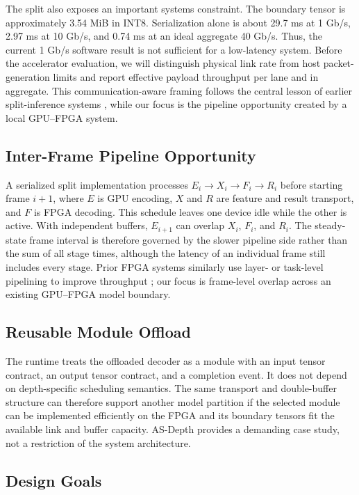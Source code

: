 \documentclass[sigconf]{support/acmart}
\begin{document}
The split also exposes an important systems constraint.  The boundary tensor is
approximately 3.54 MiB in INT8.  Serialization alone is about 29.7 ms at
1 Gb/s, 2.97 ms at 10 Gb/s, and 0.74 ms at an ideal aggregate 40 Gb/s.  Thus,
the current 1 Gb/s software result is not sufficient for a low-latency system.
Before the accelerator evaluation, we will distinguish physical link rate from
host packet-generation limits and report effective payload throughput per lane
and in aggregate.  This communication-aware framing follows the central lesson
of earlier split-inference systems \cite{matsubara2019split}, while our focus is
the pipeline opportunity created by a local GPU--FPGA system.

\subsection{Inter-Frame Pipeline Opportunity}

A serialized split implementation processes $E_i\rightarrow X_i\rightarrow
F_i\rightarrow R_i$ before starting frame $i+1$, where $E$ is GPU encoding,
$X$ and $R$ are feature and result transport, and $F$ is FPGA decoding.  This
schedule leaves one device idle while the other is active.  With independent
buffers, $E_{i+1}$ can overlap $X_i$, $F_i$, and $R_i$.  The steady-state frame
interval is therefore governed by the slower pipeline side rather than the sum
of all stage times, although the latency of an individual frame still includes
every stage.  Prior FPGA systems similarly use layer- or task-level pipelining
to improve throughput \cite{razavi2022patterns,symons2022stream}; our focus is
frame-level overlap across an existing GPU--FPGA model boundary.

\subsection{Reusable Module Offload}

The runtime treats the offloaded decoder as a module with an input tensor
contract, an output tensor contract, and a completion event.  It does not depend
on depth-specific scheduling semantics.  The same transport and double-buffer
structure can therefore support another model partition if the selected module
can be implemented efficiently on the FPGA and its boundary tensors fit the
available link and buffer capacity.  AS-Depth provides a demanding case study,
not a restriction of the system architecture.

\subsection{Design Goals}
\end{document}
